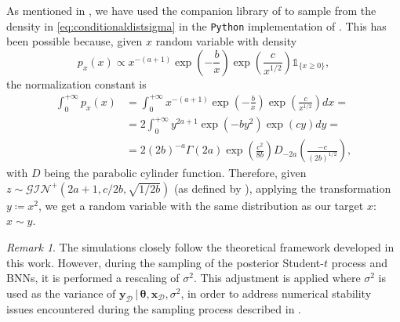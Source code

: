 \documentclass[a4paper, 11pt, reqno]{amsart}
\newcommand{\citet}[2][]{\citeauthor{#2} \cite[#1]{#2}}
\theoremstyle{plain}
\theoremstyle{remark}
\newtheorem{remark}[theorem]{Remark}
\theoremstyle{definition}
\newcommand{\given}{\, | \,}
\newcommand{\indic}[1]{\mathds{1}_{#1}}
\renewcommand{\exp}[1]{\operatorname{exp}\left(#1\right)}
\begin{document}
As mentioned in , we have used the companion library of \citet{ding2022} to sample from the density in \cref{eq:conditionaldistsigma} in the \texttt{Python} implementation of . This has been possible because, given $x$ random variable with density
\begin{equation*}
	p_{x}(x) \propto x^{-(a + 1)} \exp{-\frac{b}{x}} \exp{\frac{c}{x^{1/2}}} \indic{\{x \geq 0\}},
\end{equation*}
the normalization constant is
\begin{align*}
	\int_{0}^{+\infty} p_{x}(x) &= \int_{0}^{+\infty} x^{-(a + 1)} \exp{-\frac{b}{x}} \exp{\frac{c}{x^{1/2}}} dx = \\
	& = 2 \int_{0}^{+\infty} y^{2a + 1} \exp{-b y^2} \exp{cy} dy = \\
	&= 2 (2b)^{-a} \Gamma(2a) \exp{\frac{c^2}{8b}} D_{-2a}\left(\frac{-c}{(2b)^{1/2}}\right),
\end{align*}
with $D$ being the parabolic cylinder function. Therefore, given $z \sim \mathcal{GIN}^+(2a + 1, c/2b, \sqrt{1/2b})$ (as defined by \citet[Appendix D]{ding2022}), applying the transformation $y \coloneqq x^2$, we get a random variable with the same distribution as our target $x$: $x \sim y$.  

\begin{remark}
	The simulations closely follow the theoretical framework developed in this work. 
	However, during the sampling of the posterior Student-$t$ process and BNNs, it is performed a rescaling of $\sigma^2$. This adjustment is applied where $\sigma^2$ is used as the variance of $\bm{y}_{\mathcal{D}} \given \bm{\theta}, \bm{x}_{\mathcal{D}}, \sigma^2$, in order to address numerical stability issues encountered during the sampling process described in .
\end{remark}%
\end{document}
